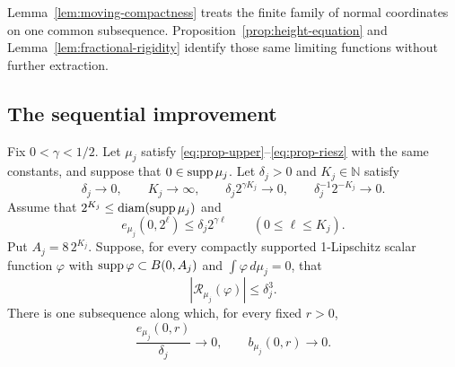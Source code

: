 Lemma~\ref{lem:moving-compactness} treats the finite family of normal
coordinates on one common subsequence. Proposition~\ref{prop:height-equation}
and Lemma~\ref{lem:fractional-rigidity} identify those same limiting
functions without further extraction.

\subsection{The sequential improvement}

\begin{proposition}
\label{prop:normalized-excess-limit}
Fix $0<\gamma<1/2$. Let $\mu_j$ satisfy
\eqref{eq:prop-upper}--\eqref{eq:prop-riesz} with the same constants,
and suppose that $0\in\operatorname{supp}\mu_j$. Let $\delta_j>0$ and
$K_j\in\mathbb N$ satisfy
\begin{equation}\label{eq:sequential-horizon-schedule}
 \delta_j\to0,\qquad K_j\to\infty,\qquad
 \delta_j2^{\gamma K_j}\to0,\qquad
 \delta_j^{-1}2^{-K_j}\to0.
\end{equation}
Assume that $2^{K_j}\le\operatorname{diam}(\operatorname{supp}\mu_j)$ and
\begin{equation}\label{eq:sequential-horizon-excess}
 e_{\mu_j}(0,2^\ell)\le\delta_j2^{\gamma\ell}
       \qquad(0\le\ell\le K_j).
\end{equation}
Put $A_j=8\,2^{K_j}$. Suppose, for every compactly supported
1-Lipschitz scalar function $\varphi$ with
$\operatorname{supp}\varphi\subset B(0,A_j)$ and $\int\varphi\,d\mu_j=0$, that
\begin{equation}\label{eq:sequential-cubic-oscillation}
 |\mathcal R_{\mu_j}(\varphi)|\le\delta_j^3.
\end{equation}
There is one subsequence along which, for every fixed $r>0$,
\begin{equation}\label{eq:sequential-excess-conclusion}
 \frac{e_{\mu_j}(0,r)}{\delta_j}\longrightarrow0,
 \qquad b_{\mu_j}(0,r)\longrightarrow0.
\end{equation}
\end{proposition}

